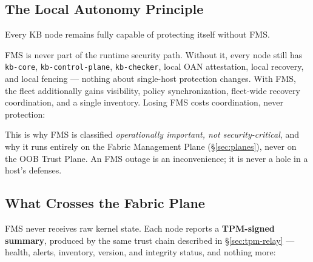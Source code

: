 \documentclass[11pt,a4paper]{article}
\begin{document}
\subsection{The Local Autonomy Principle}
\label{sec:autonomy}

\begin{notebox}
Every KB node remains fully capable of protecting itself without FMS.
\end{notebox}

FMS is never part of the runtime security path. Without it, every node
still has \texttt{kb-core}, \texttt{kb-control-plane}, \texttt{kb-checker},
local OAN attestation, local recovery, and local fencing --- nothing
about single-host protection changes. With FMS, the fleet additionally
gains visibility, policy synchronization, fleet-wide recovery
coordination, and a single inventory. Losing FMS costs coordination,
never protection:

\begin{center}
\end{center}

This is why FMS is classified \emph{operationally important, not
security-critical}, and why it runs entirely on the Fabric Management
Plane (\S\ref{sec:planes}), never on the OOB Trust Plane. An FMS outage
is an inconvenience; it is never a hole in a host's defenses.

\subsection{What Crosses the Fabric Plane}

FMS never receives raw kernel state. Each node reports a
\textbf{TPM-signed summary}, produced by the same trust chain described
in \S\ref{sec:tpm-relay} --- health, alerts, inventory, version, and
integrity status, and nothing more:

\begin{center}
\end{center}
\end{document}
